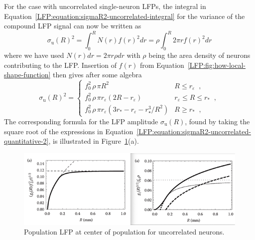 For the case with uncorrelated single-neuron LFPs, the integral in Equation~\ref{LFP:equation:sigmaR2-uncorrelated-integral} for the variance of the compound LFP signal can now
be written as 
\begin{equation}
\sigma_\text{u}(R)^2  = \int_0^R N(r)  f(r)^2 dr  = \rho \int_0^R 2 \pi r  f(r)^2 dr 
\label{LFP:equation:sigmaR2-uncorrelated-quantitative}
\end{equation}
where we have used $N(r)dr=2\pi r \rho dr$ with $\rho$ being the area density of neurons
contributing to the LFP. Insertion of $f(r)$ from 
Equation~\ref{LFP:fig:how-local-shape-function} then gives after some algebra
\begin{equation}
  \sigma_\text{u}(R)^2= 
  \begin{cases}
    f_0^2 \, \rho \, \pi R^2                   &   R \le r_\varepsilon   \;\;,\\
    f_0^2 \, \rho \, \pi r_\varepsilon (2 R - r_\varepsilon)  &   r_\varepsilon \le R \le r_*  \;\;,\\
    f_0^2 \, \rho \, \pi r_\varepsilon (3 r_* - r_\varepsilon  - r_\star^3/R^2)  & R \ge r_* \;\;,
  \end{cases}
\label{LFP:equation:sigmaR2-uncorrelated-quantitative-2}  
\end{equation}
The corresponding formula for the LFP amplitude $\sigma_\text{u}(R)$, found by taking the 
square root of the expressions in Equation~\ref{LFP:equation:sigmaR2-uncorrelated-quantitative-2},
is illustrated in Figure~\ref{LFP:fig:how-local-center-of-population}(a).  

%
\begin{figure}
\begin{center}
\includegraphics{Figures/LFP/LFP-how-local-center-of-population-w100-r150}
\end{center}
\caption[]{Population LFP at center of population for uncorrelated neurons.
}
\label{LFP:fig:how-local-center-of-population}
\end{figure}
%

